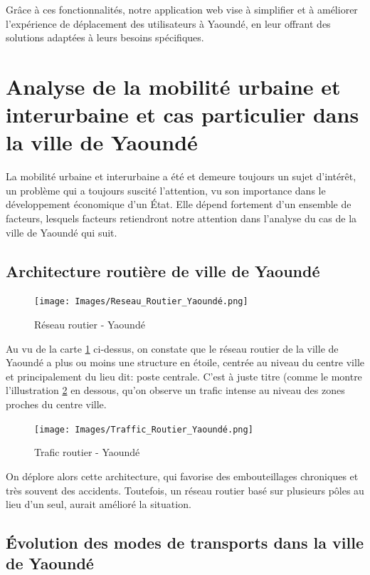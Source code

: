 \documentclass{article}
\begin{document}
Grâce à ces fonctionnalités, notre application web vise à simplifier et à améliorer l'expérience de déplacement des utilisateurs à Yaoundé, en leur offrant des solutions adaptées à leurs besoins spécifiques.



 \section{Analyse de la mobilité urbaine et interurbaine et cas particulier dans la ville de Yaoundé}

La mobilité urbaine et interurbaine a été et demeure toujours un sujet d'intérêt, un problème qui a toujours suscité l'attention, vu son importance dans le développement économique d'un État. Elle dépend fortement d'un ensemble de facteurs, lesquels facteurs retiendront notre attention dans l'analyse du cas de la ville de Yaoundé qui suit.

\subsection{Architecture routière de ville de Yaoundé}

\begin{figure}[h]
    \centering
    \texttt{[image: Images/Reseau\_Routier\_Yaoundé.png]}
    \caption{Réseau routier - Yaoundé}
    \label{fig:reseau_routier}
    \cite{mfoulou2016mobilite}
\end{figure}

Au vu de la carte \ref{fig:reseau_routier} ci-dessus, on constate que le réseau routier de la ville de Yaoundé a plus ou moins une structure en étoile, centrée au niveau du centre ville et principalement du lieu dit: poste centrale. 
C'est à juste titre (comme le montre l'illustration \ref{fig:trafic_routier} en dessous, qu'on observe un trafic intense au niveau des zones proches du centre ville.

\begin{figure}[h]
    \centering
    \texttt{[image: Images/Traffic\_Routier\_Yaoundé.png]}
    \caption{Trafic routier - Yaoundé}
    \label{fig:trafic_routier}
    \cite{mfoulou2016mobilite}
\end{figure}

On déplore alors cette architecture, qui favorise des embouteillages chroniques et très souvent des accidents.
Toutefois, un réseau routier basé sur plusieurs pôles au lieu d'un seul, aurait amélioré la situation.

\subsection{Évolution des modes de transports dans la ville de Yaoundé}
\end{document}
